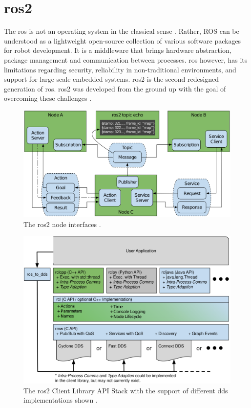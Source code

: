 \section{\gls{ros2}}
The \gls{ros} is not an operating system in the classical sense \cite{quigley_ros_nodate, noauthor_ros_nodate}. Rather, ROS can be understood as a lightweight open-source collection of various software packages for robot development. It is a middleware that brings hardware abstraction, package management and communication between processes.\newline
\gls{ros} however, has its limitations regarding security, reliability in non-traditional environments, and support for large scale embedded systems. \gls{ros2} is the second redesigned generation of \gls{ros}. \gls{ros2} was developed from the ground up with the goal of overcoming these challenges \cite{macenski_robot_2022}.
\begin{figure}[htbp]
	\centering
	\includegraphics[width=1\textwidth]{Figures/c3/ros2_node_interfaces.png}
	\caption{The \gls{ros2} node interfaces \cite{macenski_robot_2022}.}
	\label{c3_fig_ros2_node_interfaces}
\end{figure}
\begin{figure}[htbp]
	\centering
	\includegraphics[width=1\textwidth]{Figures/c3/ros2_client_library_stack.png}
	\caption{The \gls{ros2} Client Library API Stack with the support of different \gls{dds} implementations shown \cite{macenski_robot_2022}.}
	\label{c3_fig_ros2_stack}
\end{figure}
